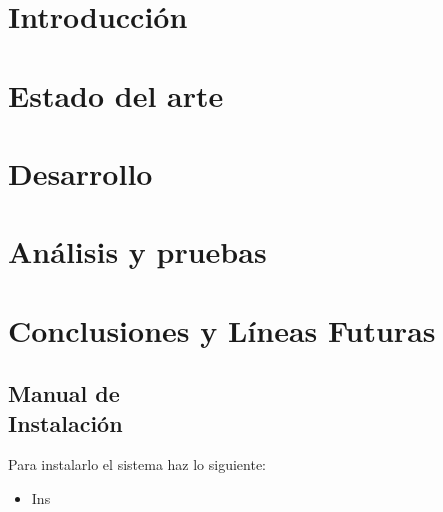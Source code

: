 \documentclass[12pt, a4paper, twoside]{article}
\begin{document}


\clearpage
\setcounter{page}{1}



\newpage



\newpage



\tableofcontents

\section{Introducción}


\section{Estado del arte}


\section{Desarrollo}


\section{Análisis y pruebas}


\section{Conclusiones y Líneas Futuras}


\printbibliography
\newpage

\begin{umaappendices}
  \section{Manual de \\ Instalación}
  Para instalarlo el sistema haz lo siguiente:
  \begin{itemize}
    \item Ins
  \end{itemize}

\end{umaappendices}


\end{document}
